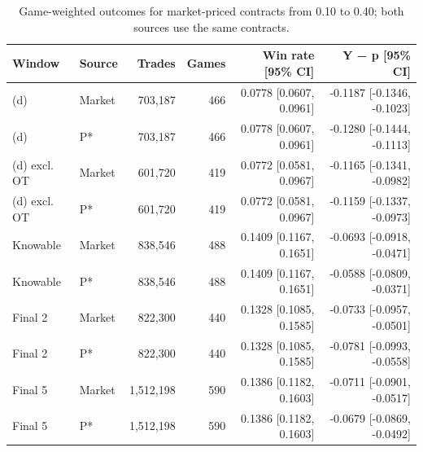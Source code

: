 \begin{table}[!htbp]
\centering
\small
\caption{Game-weighted outcomes for market-priced contracts from 0.10 to 0.40; both sources use the same contracts.}
\label{tab:moshrefi-10-40}
\begin{tabular}{llrrrr}
\toprule
Window & Source & Trades & Games & Win rate [95\% CI] & Y − p [95\% CI] \\
\midrule
(d) & Market & 703,187 & 466 & 0.0778 [0.0607, 0.0961] & -0.1187 [-0.1346, -0.1023] \\
(d) & P* & 703,187 & 466 & 0.0778 [0.0607, 0.0961] & -0.1280 [-0.1444, -0.1113] \\
(d) excl. OT & Market & 601,720 & 419 & 0.0772 [0.0581, 0.0967] & -0.1165 [-0.1341, -0.0982] \\
(d) excl. OT & P* & 601,720 & 419 & 0.0772 [0.0581, 0.0967] & -0.1159 [-0.1337, -0.0973] \\
Knowable & Market & 838,546 & 488 & 0.1409 [0.1167, 0.1651] & -0.0693 [-0.0918, -0.0471] \\
Knowable & P* & 838,546 & 488 & 0.1409 [0.1167, 0.1651] & -0.0588 [-0.0809, -0.0371] \\
Final 2 & Market & 822,300 & 440 & 0.1328 [0.1085, 0.1585] & -0.0733 [-0.0957, -0.0501] \\
Final 2 & P* & 822,300 & 440 & 0.1328 [0.1085, 0.1585] & -0.0781 [-0.0993, -0.0558] \\
Final 5 & Market & 1,512,198 & 590 & 0.1386 [0.1182, 0.1603] & -0.0711 [-0.0901, -0.0517] \\
Final 5 & P* & 1,512,198 & 590 & 0.1386 [0.1182, 0.1603] & -0.0679 [-0.0869, -0.0492] \\
\bottomrule
\end{tabular}
\end{table}
